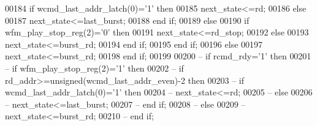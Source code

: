 \begin{DoxyCode}
00184                         \textcolor{keywordflow}{if} \textcolor{vhdlchar}{wcmd_last_addr_latch}\textcolor{vhdlchar}{(}\textcolor{vhdllogic}{}\textcolor{vhdllogic}{0}\textcolor{vhdlchar}{)}\textcolor{vhdlchar}{=}\textcolor{vhdlchar}{'}\textcolor{vhdllogic}{}\textcolor{vhdllogic}{1}\textcolor{vhdlchar}{'} \textcolor{keywordflow}{then}
00185                             \textcolor{vhdlchar}{next_state}\textcolor{vhdlchar}{<=}\textcolor{vhdlchar}{rd}; 
00186                         \textcolor{keywordflow}{else} 
00187                             \textcolor{vhdlchar}{next_state}\textcolor{vhdlchar}{<=}\textcolor{vhdlchar}{last\_burst};
00188                         \textcolor{keywordflow}{end} \textcolor{keywordflow}{if};
00189                     \textcolor{keywordflow}{else} 
00190                         \textcolor{keywordflow}{if} \textcolor{vhdlchar}{wfm_play_stop_reg}\textcolor{vhdlchar}{(}\textcolor{vhdllogic}{}\textcolor{vhdllogic}{2}\textcolor{vhdlchar}{)}\textcolor{vhdlchar}{=}\textcolor{vhdlchar}{'}\textcolor{vhdllogic}{}\textcolor{vhdllogic}{0}\textcolor{vhdlchar}{'} \textcolor{keywordflow}{then}
00191                             \textcolor{vhdlchar}{next_state}\textcolor{vhdlchar}{<=}\textcolor{vhdlchar}{rd\_stop};
00192                         \textcolor{keywordflow}{else} 
00193                             \textcolor{vhdlchar}{next_state}\textcolor{vhdlchar}{<=}\textcolor{vhdlchar}{burst\_rd};
00194                         \textcolor{keywordflow}{end} \textcolor{keywordflow}{if};
00195                     \textcolor{keywordflow}{end} \textcolor{keywordflow}{if};
00196             \textcolor{keywordflow}{else} 
00197                 \textcolor{vhdlchar}{next_state}\textcolor{vhdlchar}{<=}\textcolor{vhdlchar}{burst\_rd};
00198             \textcolor{keywordflow}{end} \textcolor{keywordflow}{if};
00199 
00200 \textcolor{keyword}{--          if rcmd\_rdy='1' then }
00201 \textcolor{keyword}{--              if wfm\_play\_stop\_reg(2)='1' then}
00202 \textcolor{keyword}{--                  if rd\_addr>=unsigned(wcmd\_last\_addr\_even)-2 then }
00203 \textcolor{keyword}{--                      if wcmd\_last\_addr\_latch(0)='1' then}
00204 \textcolor{keyword}{--                          next\_state<=rd; }
00205 \textcolor{keyword}{--                      else }
00206 \textcolor{keyword}{--                          next\_state<=last\_burst;}
00207 \textcolor{keyword}{--                      end if;}
00208 \textcolor{keyword}{--                  else }
00209 \textcolor{keyword}{--                      next\_state<=burst\_rd;}
00210 \textcolor{keyword}{--                  end if;}

\end{DoxyCode}
